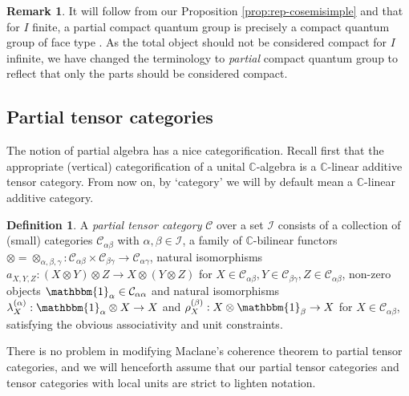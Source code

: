 \documentclass[10pt]{article}
\newcommand{\C}{\mathbb{C}}
\newcommand{\CatC}{\mathcal{C}}
\newcommand{\CatCC}{\mathscr{C}}
\newcommand{\Unitb}{\mathbbm{1}}
\theoremstyle{definition}
\newtheorem{Def}[Theorem]{Definition}
\newtheorem{Rem}[Theorem]{Remark}
\numberwithin{equation}{section}
\begin{document}
\begin{Rem} It will follow from our Proposition \ref{prop:rep-cosemisimple} and  \cite[Theorem 3.3 and Theorem 4.4]{Hay1} that for $I$ finite, a partial compact quantum group is precisely a compact quantum group of face type \cite[Definition 4.1]{Hay1}. As the total object should not be considered compact for $I$ infinite, we have changed the terminology to \emph{partial} compact quantum group to reflect that only the parts should be considered compact.
\end{Rem} 

\subsection{Partial tensor categories}

The notion of partial algebra has a nice categorification. Recall first that the appropriate (vertical) categorification of a unital $\C$-algebra is a $\C$-linear additive tensor category. From now on, by `category' we will by default mean a $\C$-linear additive category. 

\begin{Def} A \emph{partial tensor category} $\CatCC$ over a set $\mathscr{I}$ consists of  a collection of (small) categories $\mathcal{C}_{\alpha\beta}$ with $\alpha,\beta\in \mathscr{I}$, a family of $\C$-bilinear functors $\otimes = \otimes_{\alpha,\beta,\gamma}: \CatC_{\alpha\beta}\times \CatC_{\beta\gamma}\rightarrow \CatC_{\alpha\gamma}$, natural isomorphisms $a_{X,Y,Z}: (X\otimes Y)\otimes Z \rightarrow X\otimes (Y\otimes Z)$ for $X \in \CatC_{\alpha\beta},Y\in \CatC_{\beta\gamma},Z\in \CatC_{\alpha\beta}$, non-zero objects $\Unitb_{\alpha} \in \CatC_{\alpha\alpha}$ and natural isomorphisms $\lambda_X^{(\alpha)}:\Unitb_\alpha\otimes X \rightarrow X$ and $\rho_X^{(\beta)}:X\otimes \Unitb_\beta\rightarrow X$ for $X\in \CatC_{\alpha\beta}$, satisfying the obvious associativity and unit constraints. 
\end{Def}

There is no problem in modifying Maclane's coherence theorem to partial tensor categories, and we will henceforth assume that our partial tensor categories and tensor categories with local units are strict to lighten notation. 
\end{document}
